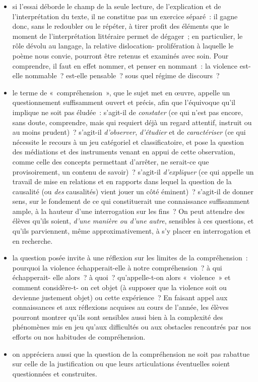 {\begin{itemize}
\item si l'essai déborde le champ de la seule lecture, de l'explication et de l'interprétation
du texte, il ne constitue pas un exercice séparé~: il gagne donc, sans le redoubler ou
le répéter, à tirer profit des éléments que le moment de l'interprétation littéraire
permet de dégager~; en particulier, le rôle dévolu au langage, la relative dislocation-
prolifération à laquelle le poème nous convie, pourront être retenus et examinés
avec soin. Pour comprendre, il faut en effet nommer, et penser en nommant~: la
violence est-elle nommable~? est-elle pensable~? sous quel régime de discours~?
\item le terme de «~compréhension~», que le sujet met en œuvre, appelle un
questionnement suffisamment ouvert et précis, afin que l'équivoque qu'il
implique ne soit pas éludée~: s'agit-il de \textit{constater} (ce qui n'est pas encore, sans
doute, comprendre, mais qui requiert déjà un regard attentif, instruit ou au moins
prudent)~? s'agit-il \textit{d'observer}, \textit{d'étudier} et de \textit{caractériser} (ce qui nécessite le
recours à un jeu catégoriel et classificatoire, et pose la question des médiations et
des instruments venant en appui de cette observation, comme celle des concepts
permettant d'arrêter, ne serait-ce que provisoirement, un contenu de savoir)~?
s'agit-il \textit{d'expliquer} (ce qui appelle un travail de mise en relations et en rapports
dans lequel la question de la causalité (ou \textit{des} causalités) vient jouer un côté
éminent)~? s'agit-il de donner sens, sur le fondement de ce qui constituerait une
connaissance suffisamment ample, à la hauteur d'une interrogation sur les fins~?
On peut attendre des élèves qu'ils soient, \textit{d'une manière ou d'une autre}, sensibles
à ces questions, et qu'ils parviennent, même approximativement, à s'y placer en
interrogation et en recherche.
\item la question posée invite à une réflexion sur les limites de la compréhension~:
pourquoi la violence échapperait-elle à notre compréhension~? à qui échapperait-
elle alors~? à quoi~? qu'appelle-t-on alors «~violence~» et comment considère-t-
on cet objet (à supposer que la violence soit ou devienne justement objet) ou
cette expérience~? En faisant appel aux connaissances et aux réflexions acquises
au cours de l'année, les élèves pourront montrer qu'ils sont sensibles aussi bien
à la complexité des phénomènes mis en jeu qu'aux difficultés ou aux obstacles
rencontrés par nos efforts ou nos habitudes de compréhension.
\item on appréciera aussi que la question de la compréhension ne soit pas rabattue sur
celle de la justification ou que leurs articulations éventuelles soient questionnées
et construites.
\end{itemize}}

